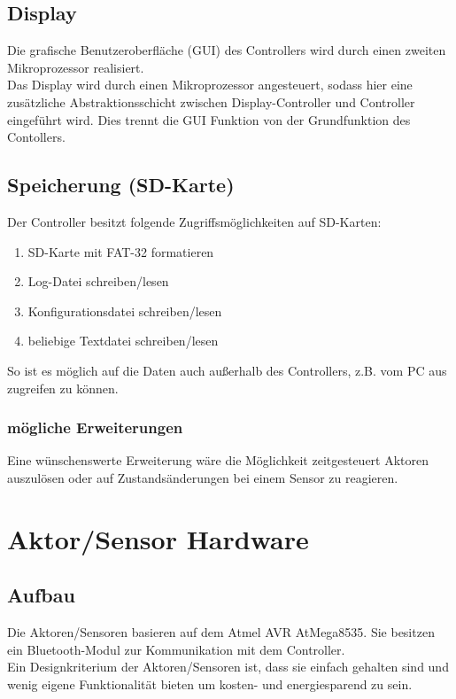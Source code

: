\documentclass[12pt,a4paper]{article}
\begin{document}
\subsection{Display}

Die grafische Benutzeroberfläche (GUI) des Controllers wird durch einen zweiten Mikroprozessor realisiert. \\
Das Display wird durch einen Mikroprozessor angesteuert, sodass hier eine zusätzliche Abstraktionsschicht zwischen Display-Controller und Controller eingeführt wird. Dies trennt die GUI Funktion von der Grundfunktion des Contollers. \\

\subsection{Speicherung (SD-Karte)}

Der Controller besitzt folgende Zugriffsmöglichkeiten auf SD-Karten:

\begin{enumerate}
	\item SD-Karte mit FAT-32 formatieren
	\item Log-Datei schreiben/lesen
	\item Konfigurationsdatei schreiben/lesen
	\item beliebige Textdatei schreiben/lesen
\end{enumerate}

So ist es möglich auf die Daten auch außerhalb des Controllers, z.B. vom PC aus zugreifen zu können.

\subsubsection{mögliche Erweiterungen}

Eine wünschenswerte Erweiterung wäre die Möglichkeit zeitgesteuert Aktoren auszulösen oder auf Zustandsänderungen bei einem Sensor zu reagieren.

\section{Aktor/Sensor Hardware}

\subsection{Aufbau}

Die Aktoren/Sensoren basieren auf dem Atmel AVR AtMega8535. Sie besitzen ein Bluetooth-Modul zur Kommunikation mit dem Controller. \\
Ein Designkriterium der Aktoren/Sensoren ist, dass sie einfach gehalten sind und wenig eigene Funktionalität bieten um kosten- und energiesparend zu sein.
\end{document}
